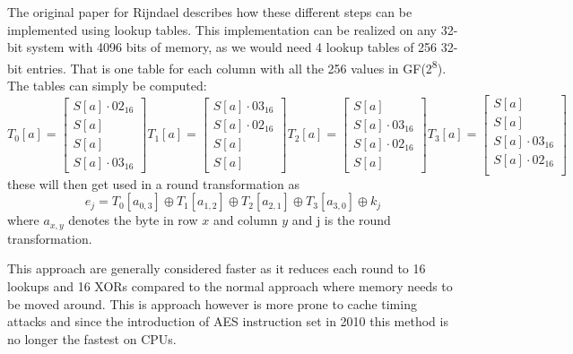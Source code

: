 \documentclass[a4paper, openany]{book}
\begin{document}
\begin{abstact}
The original paper for Rijndael\cite{Rijndael} describes how these different steps can be implemented using lookup tables. This implementation can be realized on any 32-bit system with 4096 bits of memory, as we would need 4 lookup tables of 256 32-bit entries. That is one table for each column with all the 256 values in GF(2\textsuperscript{8}). The tables can simply be computed:
\begin{equation}
T_0[a] = \begin{bmatrix}
          S[a] \cdot 02_{16}\\
          S[a]\\
          S[a]\\
          S[a] \cdot 03_{16}
\end{bmatrix}
T_1[a] = \begin{bmatrix}
          S[a] \cdot 03_{16}\\
          S[a] \cdot 02_{16}\\
          S[a]\\
          S[a]
\end{bmatrix}
T_2[a] = \begin{bmatrix}
          S[a]\\
          S[a] \cdot 03_{16}\\
          S[a] \cdot 02_{16}\\
          S[a]
\end{bmatrix}
T_3[a] = \begin{bmatrix}
          S[a]\\
          S[a]\\
          S[a] \cdot 03_{16}\\
          S[a] \cdot 02_{16}\\
\end{bmatrix}
\end{equation}
these will then get used in a round transformation as
\begin{equation}
e_j = T_0 [a_{0,3}] \oplus T_1 [a_{1,2}] \oplus T_2 [a_{2,1}] \oplus T_3 [a_{3,0}] \oplus k_j
\end{equation}
where \(a_{x,y}\) denotes the byte in row \(x\) and column \(y\) and j is the round transformation.

This approach are generally considered faster as it reduces each round to 16 lookups and 16 XORs compared to the normal approach where memory needs to be moved around. This is approach however is more prone to cache timing attacks and since the introduction of AES instruction set in 2010 this method is no longer the fastest on CPUs.

\end{abstact}
\end{document}
